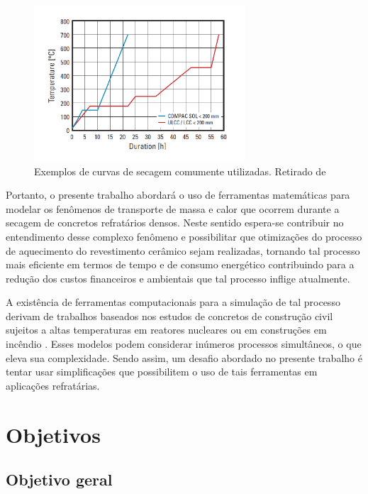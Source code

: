     \begin{figure}[!ht]
        \centering
        \includegraphics[width=0.7\textwidth]{figures/hucs.pdf}
        \caption{Exemplos de curvas de secagem comumente utilizadas. Retirado de \cite{rhi}}
        \label{fig:hucs}
   \end{figure}

   Portanto, o presente trabalho abordará o uso de ferramentas matemáticas para
   modelar os fenômenos de transporte de massa e calor que ocorrem durante a
   secagem de concretos refratários densos. Neste sentido espera-se contribuir
   no entendimento desse complexo fenômeno e possibilitar que otimizações do
   processo de aquecimento do revestimento cerâmico sejam realizadas, tornando
   tal processo mais eficiente em termos de tempo e de consumo energético
   contribuindo para a redução dos custos financeiros e ambientais que tal
   processo inflige atualmente.
 
   A existência de ferramentas computacionais para a simulação de tal processo
   derivam de trabalhos baseados nos estudos de concretos de construção civil
   sujeitos a altas temperaturas em reatores nucleares ou em construções em
   incêndio \cite{bazant1978thermal, Abdel-Rahman1996, Gawin2004}. Esses modelos
   podem considerar inúmeros processos simultâneos, o que eleva sua
   complexidade. Sendo assim, um desafio abordado no presente trabalho é tentar
   usar simplificações que possibilitem o uso de tais ferramentas em aplicações
   refratárias.
   
\section{Objetivos}
    \subsection{Objetivo geral}
        
